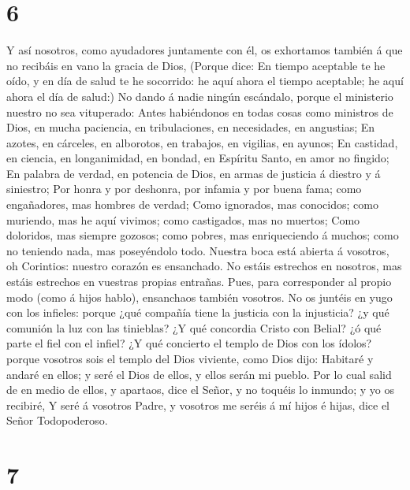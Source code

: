 \hypertarget{section-5}{%
\section{6}\label{section-5}}

 Y así nosotros, como ayudadores juntamente con él, os
exhortamos también á que no recibáis en vano la gracia de Dios,
 (Porque dice: En tiempo aceptable te he oído, y en día de
salud te he socorrido: he aquí ahora el tiempo aceptable; he aquí ahora
el día de salud:)  No dando á nadie ningún escándalo, porque
el ministerio nuestro no sea vituperado:  Antes habiéndonos
en todas cosas como ministros de Dios, en mucha paciencia, en
tribulaciones, en necesidades, en angustias;  En azotes, en
cárceles, en alborotos, en trabajos, en vigilias, en ayunos;
 En castidad, en ciencia, en longanimidad, en bondad, en
Espíritu Santo, en amor no fingido;  En palabra de verdad,
en potencia de Dios, en armas de justicia á diestro y á siniestro;
 Por honra y por deshonra, por infamia y por buena fama;
como engañadores, mas hombres de verdad;  Como ignorados,
mas conocidos; como muriendo, mas he aquí vivimos; como castigados, mas
no muertos;  Como doloridos, mas siempre gozosos; como
pobres, mas enriqueciendo á muchos; como no teniendo nada, mas
poseyéndolo todo.  Nuestra boca está abierta á vosotros, oh
Corintios: nuestro corazón es ensanchado.  No estáis
estrechos en nosotros, mas estáis estrechos en vuestras propias
entrañas.  Pues, para corresponder al propio modo (como á
hijos hablo), ensanchaos también vosotros.  No os juntéis
en yugo con los infieles: porque ¿qué compañía tiene la justicia con la
injusticia? ¿y qué comunión la luz con las tinieblas?  ¿Y
qué concordia Cristo con Belial? ¿ó qué parte el fiel con el infiel?
 ¿Y qué concierto el templo de Dios con los ídolos? porque
vosotros sois el templo del Dios viviente, como Dios dijo: Habitaré y
andaré en ellos; y seré el Dios de ellos, y ellos serán mi pueblo.
 Por lo cual salid de en medio de ellos, y apartaos, dice
el Señor, y no toquéis lo inmundo; y yo os recibiré,  Y
seré á vosotros Padre, y vosotros me seréis á mí hijos é hijas, dice el
Señor Todopoderoso.

\hypertarget{section-6}{%
\section{7}\label{section-6}}

